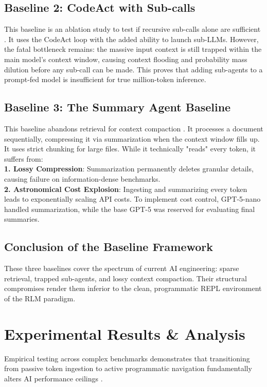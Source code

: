 \subsection{Baseline 2: CodeAct with Sub-calls}
This baseline is an ablation study to test if recursive sub-calls alone are sufficient \cite{wang2024}. It uses the CodeAct loop with the added ability to launch sub-LLMs. However, the fatal bottleneck remains: the massive input context is still trapped within the main model's context window, causing context flooding and probability mass dilution before any sub-call can be made. This proves that adding sub-agents to a prompt-fed model is insufficient for true million-token inference.

\subsection{Baseline 3: The Summary Agent Baseline}
This baseline abandons retrieval for context compaction \cite{wu2025}. It processes a document sequentially, compressing it via summarization when the context window fills up. It uses strict chunking for large files. While it technically "reads" every token, it suffers from: \\
\textbf{1. Lossy Compression}: Summarization permanently deletes granular details, causing failure on information-dense benchmarks. \\
\textbf{2. Astronomical Cost Explosion}: Ingesting and summarizing every token leads to exponentially scaling API costs. To implement cost control, GPT-5-nano handled summarization, while the base GPT-5 was reserved for evaluating final summaries.



\subsection{Conclusion of the Baseline Framework}
These three baselines cover the spectrum of current AI engineering: sparse retrieval, trapped sub-agents, and lossy context compaction. Their structural compromises render them inferior to the clean, programmatic REPL environment of the RLM paradigm.

\section{Experimental Results \& Analysis}
Empirical testing across complex benchmarks demonstrates that transitioning from passive token ingestion to active programmatic navigation fundamentally alters AI performance ceilings \cite{zhang2025, chen2025, bertsch2025}.

